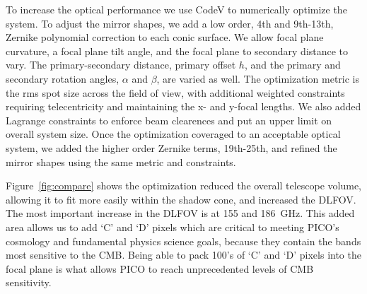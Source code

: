 \documentclass[]{spie}  %
\newcommand{\comr}[1]{\textcolor{red}{#1}}
\begin{document}

To increase the optical performance we use CodeV to numerically optimize the system.  To adjust the mirror shapes, we add a low order, 
4th and 9th-13th, Zernike polynomial correction to each conic surface.  We allow focal plane curvature, a focal plane tilt angle, 
and the focal plane to secondary distance to vary.  The primary-secondary distance, primary offset $h$, and the primary and secondary 
rotation angles, $\alpha$ and $\beta$, are varied as well. The optimization metric is the rms spot size across the field of view, with 
additional weighted constraints requiring telecentricity and maintaining the x- and y-focal lengths.  We also added Lagrange constraints 
to enforce beam clearences and put an upper limit on overall system size.  Once the optimization coveraged to an acceptable optical 
system, we added the higher order Zernike terms, 19th-25th, and refined the mirror shapes using the same metric and constraints.


Figure~\ref{fig:compare} 
shows the optimization reduced the overall telescope volume, allowing it to fit more easily within the shadow cone, and increased the DLFOV.  The most important increase in the DLFOV is
at 155 and 186~GHz.  This added area allows us to add `C' and `D' pixels which are critical to meeting PICO's cosmology and fundamental 
physics science goals, because they contain the bands most sensitive to the CMB. Being able to pack 100's of `C' and `D' pixels into the focal 
plane is what allows PICO to reach unprecedented levels of CMB sensitivity.
\end{document}
